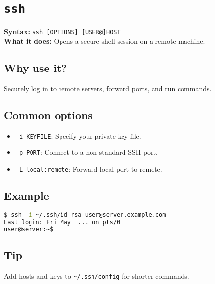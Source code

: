 \documentclass[10pt,oneside]{scrbook}
\begin{document}
\section{\texttt{ssh}}
\begin{cmdbox}
  \textbf{Syntax:} \lstinline!ssh [OPTIONS] [USER@]HOST! \\
  \textbf{What it does:} Opens a secure shell session on a remote machine.
\end{cmdbox}
\begin{commanddetails}
  \subsection*{Why use it?}
    Securely log in to remote servers, forward ports, and run commands.

  \subsection*{Common options}
    \begin{itemize}
      \item \lstinline!-i KEYFILE!: Specify your private key file.
      \item \lstinline!-p PORT!: Connect to a non-standard SSH port.
      \item \lstinline!-L local:remote!: Forward local port to remote.
    \end{itemize}

  \subsection*{Example}
  \begin{lstlisting}[language=bash]
$ ssh -i ~/.ssh/id_rsa user@server.example.com
Last login: Fri May  ... on pts/0
user@server:~$
  \end{lstlisting}

  \subsection*{Tip}
    Add hosts and keys to \lstinline!~/.ssh/config! for shorter commands.
\end{commanddetails}

\end{document}
